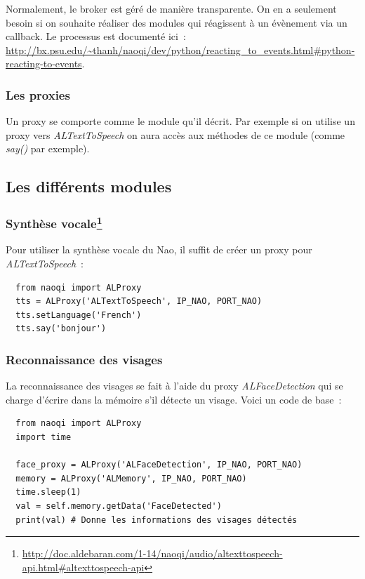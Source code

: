 \documentclass{article}
\begin{document}
Normalement, le broker est géré de manière transparente. On en a seulement besoin si on souhaite réaliser des modules qui réagissent à un évènement via un callback. Le processus est documenté ici~: \url{http://bx.psu.edu/~thanh/naoqi/dev/python/reacting_to_events.html#python-reacting-to-events}.

\subsubsection{Les proxies}

Un proxy se comporte comme le module qu'il décrit. Par exemple si on utilise un proxy vers \emph{ALTextToSpeech} on aura accès aux méthodes de ce module (comme \emph{say()} par exemple).

\subsection{Les différents modules}

\subsubsection{Synthèse vocale\footnote{\url{http://doc.aldebaran.com/1-14/naoqi/audio/altexttospeech-api.html#altexttospeech-api}}}

Pour utiliser la synthèse vocale du Nao, il suffit de créer un proxy pour \emph{ALTextToSpeech}~:

\begin{verbatim}
  from naoqi import ALProxy
  tts = ALProxy('ALTextToSpeech', IP_NAO, PORT_NAO)
  tts.setLanguage('French')
  tts.say('bonjour')
\end{verbatim}

\subsubsection{Reconnaissance des visages}

La reconnaissance des visages se fait à l'aide du proxy \emph{ALFaceDetection} qui se charge d'écrire dans la mémoire s'il détecte un visage. Voici un code de base~:

\begin{verbatim}
  from naoqi import ALProxy
  import time

  face_proxy = ALProxy('ALFaceDetection', IP_NAO, PORT_NAO)
  memory = ALProxy('ALMemory', IP_NAO, PORT_NAO)
  time.sleep(1)
  val = self.memory.getData('FaceDetected')
  print(val) # Donne les informations des visages détectés
\end{verbatim}
\end{document}
